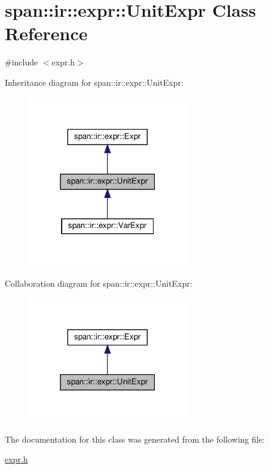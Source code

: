 \hypertarget{classspan_1_1ir_1_1expr_1_1UnitExpr}{}\section{span\+:\+:ir\+:\+:expr\+:\+:Unit\+Expr Class Reference}
\label{classspan_1_1ir_1_1expr_1_1UnitExpr}


{\ttfamily \#include $<$expr.\+h$>$}



Inheritance diagram for span\+:\+:ir\+:\+:expr\+:\+:Unit\+Expr\+:\nopagebreak
\begin{figure}[H]
\begin{center}
\leavevmode
\includegraphics[width=198pt]{classspan_1_1ir_1_1expr_1_1UnitExpr__inherit__graph}
\end{center}
\end{figure}


Collaboration diagram for span\+:\+:ir\+:\+:expr\+:\+:Unit\+Expr\+:\nopagebreak
\begin{figure}[H]
\begin{center}
\leavevmode
\includegraphics[width=198pt]{classspan_1_1ir_1_1expr_1_1UnitExpr__coll__graph}
\end{center}
\end{figure}


The documentation for this class was generated from the following file\+:\begin{DoxyCompactItemize}
\item 
\hyperlink{expr_8h}{expr.\+h}\end{DoxyCompactItemize}
